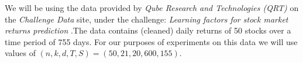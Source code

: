 \newpage
{}
We will be using the data provided by \textit{Qube Research and Technologies (QRT)} on the \textit{Challenge Data} site, under the challenge: \textit{Learning factors for stock market returns prediction} \cite{qrt_challenge}.\newline The data contains (cleaned) daily returns of 50 stocks over a time period of 755 days. For our purposes of experiments on this data we will use values of $(n,k,d,T,S) = (50,21,20,600,155)$.

